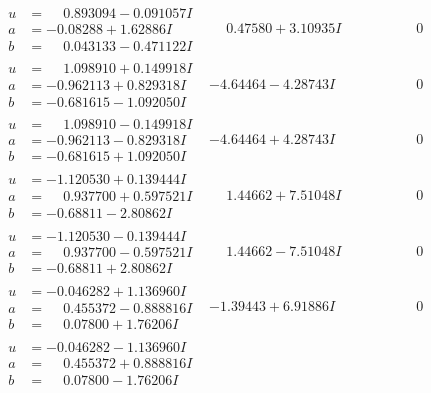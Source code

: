 \documentclass[1p]{elsarticle_modified}
\theoremstyle{definition}
\begin{document}
$$\begin{array}{c|c|c}
\begin{aligned}
u &= \phantom{-}0.893094 - 0.091057 I \\
a &= -0.08288 + 1.62886 I \\
b &= \phantom{-}0.043133 - 0.471122 I\end{aligned}
 & \phantom{-}0.47580 + 3.10935 I & \phantom{-0.000000 } 0 \\ \hline\begin{aligned}
u &= \phantom{-}1.098910 + 0.149918 I \\
a &= -0.962113 + 0.829318 I \\
b &= -0.681615 - 1.092050 I\end{aligned}
 & -4.64464 - 4.28743 I & \phantom{-0.000000 } 0 \\ \hline\begin{aligned}
u &= \phantom{-}1.098910 - 0.149918 I \\
a &= -0.962113 - 0.829318 I \\
b &= -0.681615 + 1.092050 I\end{aligned}
 & -4.64464 + 4.28743 I & \phantom{-0.000000 } 0 \\ \hline\begin{aligned}
u &= -1.120530 + 0.139444 I \\
a &= \phantom{-}0.937700 + 0.597521 I \\
b &= -0.68811 - 2.80862 I\end{aligned}
 & \phantom{-}1.44662 + 7.51048 I & \phantom{-0.000000 } 0 \\ \hline\begin{aligned}
u &= -1.120530 - 0.139444 I \\
a &= \phantom{-}0.937700 - 0.597521 I \\
b &= -0.68811 + 2.80862 I\end{aligned}
 & \phantom{-}1.44662 - 7.51048 I & \phantom{-0.000000 } 0 \\ \hline\begin{aligned}
u &= -0.046282 + 1.136960 I \\
a &= \phantom{-}0.455372 - 0.888816 I \\
b &= \phantom{-}0.07800 + 1.76206 I\end{aligned}
 & -1.39443 + 6.91886 I & \phantom{-0.000000 } 0 \\ \hline\begin{aligned}
u &= -0.046282 - 1.136960 I \\
a &= \phantom{-}0.455372 + 0.888816 I \\
b &= \phantom{-}0.07800 - 1.76206 I\end{aligned}

\end{array}$$
\end{document}
